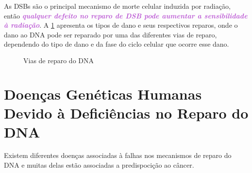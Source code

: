 \documentclass[11pt,a4paper]{article}
\begin{document}
	As DSBs são o principal mecanismo de morte celular induzida por radiação, então\textcolor{MediumOrchid}{\textbf{\textit{ qualquer defeito no reparo de DSB pode aumentar a sensibilidade à radiação}}}. A \ref{fig:danoEReparonoDna} apresenta os tipos de dano e seus respectivos reparos, onde o dano ao DNA pode ser reparado por uma das diferentes vias de reparo, dependendo do tipo de dano e da fase do ciclo celular que ocorre esse dano.

	\begin{figure}[h]
		\centering
		\caption{Vias de reparo do DNA}
		\label{fig:danoEReparonoDna}
	\end{figure}

\section{Doenças Genéticas Humanas Devido à Deficiências no Reparo do DNA}

	Existem diferentes doenças associadas à falhas nos mecanismos de reparo do DNA e muitas delas estão associadas a predispocição ao câncer.
\end{document}
